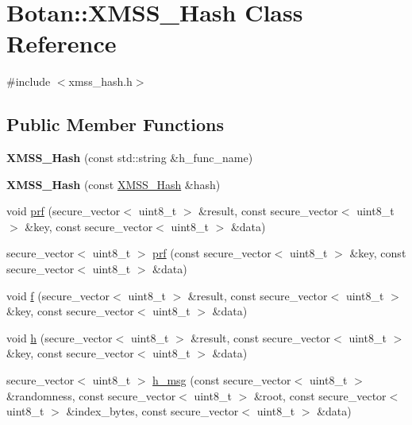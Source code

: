 \hypertarget{class_botan_1_1_x_m_s_s___hash}{}\section{Botan\+:\+:X\+M\+S\+S\+\_\+\+Hash Class Reference}
\label{class_botan_1_1_x_m_s_s___hash}


{\ttfamily \#include $<$xmss\+\_\+hash.\+h$>$}

\subsection*{Public Member Functions}
\begin{DoxyCompactItemize}
\item 
\mbox{\label{class_botan_1_1_x_m_s_s___hash_aa8e3ca390cb1fefb103e286a2c114d63}} 
{\bfseries X\+M\+S\+S\+\_\+\+Hash} (const std\+::string \&h\+\_\+func\+\_\+name)
\item 
\mbox{\label{class_botan_1_1_x_m_s_s___hash_ab5f3b545d9ade5dbe9a2d01d5a41afe8}} 
{\bfseries X\+M\+S\+S\+\_\+\+Hash} (const \hyperlink{class_botan_1_1_x_m_s_s___hash}{X\+M\+S\+S\+\_\+\+Hash} \&hash)
\item 
void \hyperlink{class_botan_1_1_x_m_s_s___hash_ae2b2924e198c9ce9313b21457235da18}{prf} (secure\+\_\+vector$<$ uint8\+\_\+t $>$ \&result, const secure\+\_\+vector$<$ uint8\+\_\+t $>$ \&key, const secure\+\_\+vector$<$ uint8\+\_\+t $>$ \&data)
\item 
secure\+\_\+vector$<$ uint8\+\_\+t $>$ \hyperlink{class_botan_1_1_x_m_s_s___hash_a482ef09eb806251e85883850ba9f6df1}{prf} (const secure\+\_\+vector$<$ uint8\+\_\+t $>$ \&key, const secure\+\_\+vector$<$ uint8\+\_\+t $>$ \&data)
\item 
void \hyperlink{class_botan_1_1_x_m_s_s___hash_a142126cdbb5969ffdf13daeb6b903dc2}{f} (secure\+\_\+vector$<$ uint8\+\_\+t $>$ \&result, const secure\+\_\+vector$<$ uint8\+\_\+t $>$ \&key, const secure\+\_\+vector$<$ uint8\+\_\+t $>$ \&data)
\item 
void \hyperlink{class_botan_1_1_x_m_s_s___hash_aa8acd1aad6c7812f858b30e9b2a8cb88}{h} (secure\+\_\+vector$<$ uint8\+\_\+t $>$ \&result, const secure\+\_\+vector$<$ uint8\+\_\+t $>$ \&key, const secure\+\_\+vector$<$ uint8\+\_\+t $>$ \&data)
\item 
secure\+\_\+vector$<$ uint8\+\_\+t $>$ \hyperlink{class_botan_1_1_x_m_s_s___hash_a3b2f52103b143001794d3db3aa62d1b1}{h\+\_\+msg} (const secure\+\_\+vector$<$ uint8\+\_\+t $>$ \&randomness, const secure\+\_\+vector$<$ uint8\+\_\+t $>$ \&root, const secure\+\_\+vector$<$ uint8\+\_\+t $>$ \&index\+\_\+bytes, const secure\+\_\+vector$<$ uint8\+\_\+t $>$ \&data)

\end{DoxyCompactItemize}
